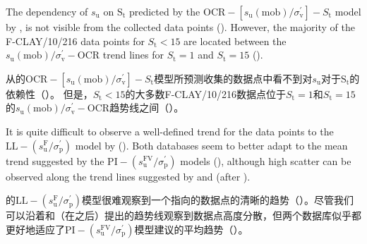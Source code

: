 \begin{ParaColumn}
    \switchcolumn*

    The dependency of $s_{\mathrm{u}}$ on $\mathrm{S}_{\mathrm{t}}$ predicted by the $\mathrm{OCR}-\left[s_{\mathrm{u}}(\mathrm{mob}) / \sigma_{\mathrm{v}}^{\prime}\right]-S_{\mathrm{t}}$ model by \citet{Ching2012522}, is not visible from the collected data points (). However, the majority of the F-CLAY/10/216 data points for $S_{\mathrm{t}}<15$ are located between the $s_{\mathrm{u}}(\mathrm{mob}) / \sigma_{\mathrm{v}}^{\prime}-\mathrm{OCR}$ trend lines for $S_{\mathrm{t}}=1$ and $S_{\mathrm{t}}=15$ ().

    \switchcolumn

    从\citet{Ching2012522}的$\mathrm{OCR}-\left[s_{\mathrm{u}}(\mathrm{mob}) / \sigma_{\mathrm{v}}^{\prime}\right]-S_{\mathrm{t}}$模型所预测收集的数据点中看不到对$s_{\mathrm{u}}$对于$\mathrm{S}_{\mathrm{t}}$的依赖性（）。 但是，$S_{\mathrm{t}}<15$的大多数F-CLAY/10/216数据点位于$S_{\mathrm{t}}=1$和$S_{\mathrm{t}}=15$的$s_{\mathrm{u}}(\mathrm{mob}) / \sigma_{\mathrm{v}}^{\prime}-\mathrm{OCR}$趋势线之间（）。

    \switchcolumn*

    It is quite difficult to observe a well-defined trend for the data points to the $\mathrm{LL}-\left(s_{\mathrm{u}}^{\mathrm{F}} / \sigma_{\mathrm{p}}^{\prime}\right)$ model by \citet{Hansbo1957} (). Both databases seem to better adapt to the mean trend suggested by the $\mathrm{PI}-\left(s_{\mathrm{u}}^{\mathrm{FV}} / \sigma_{\mathrm{p}}^{\prime}\right)$ models (), although high scatter can be observed along the trend lines suggested by \citet{Larsson1980591} and \citet{Chandler198813} (after \citet{Skempton195419}).

    \switchcolumn

    \citet{Hansbo1957}的$\mathrm{LL}-\left(s_{\mathrm{u}}^{\mathrm{F}} / \sigma_{\mathrm{p}}^{\prime}\right)$模型很难观察到一个指向的数据点的清晰的趋势（）。尽管我们可以沿着\citet{Larsson1980591}和\citet{Chandler198813}（在\citet{Skempton195419}之后）提出的趋势线观察到数据点高度分散，但两个数据库似乎都更好地适应了$\mathrm{PI}-\left(s_{\mathrm{u}}^{\mathrm{FV}} / \sigma_{\mathrm{p}}^{\prime}\right)$模型建议的平均趋势（）。

    \switchcolumn*


\end{ParaColumn}
